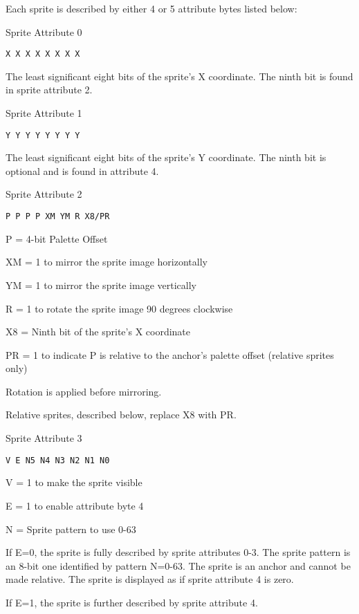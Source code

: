 Each sprite is described by either 4 or 5 attribute bytes listed
below:

Sprite Attribute 0
\begin{verbatim}
X X X X X X X X
\end{verbatim}
The least significant eight bits of the sprite’s X coordinate. The
ninth bit is found in sprite attribute 2.

Sprite Attribute 1
\begin{verbatim}
Y Y Y Y Y Y Y Y
\end{verbatim}
The least significant eight bits of the sprite’s Y coordinate. The
ninth bit is optional and is found in attribute 4.

Sprite Attribute 2
\begin{verbatim}
P P P P XM YM R X8/PR
\end{verbatim}
P = 4-bit Palette Offset

XM = 1 to mirror the sprite image horizontally

YM = 1 to mirror the sprite image vertically

R = 1 to rotate the sprite image 90 degrees clockwise

X8 = Ninth bit of the sprite’s X coordinate

PR = 1 to indicate P is relative to the anchor’s palette offset
(relative sprites only)

Rotation is applied before mirroring.

Relative sprites, described below, replace X8 with PR.


Sprite Attribute 3
\begin{verbatim}
V E N5 N4 N3 N2 N1 N0
\end{verbatim}
V = 1 to make the sprite visible

E = 1 to enable attribute byte 4

N = Sprite pattern to use 0-63

If E=0, the sprite is fully described by sprite attributes 0-3. The
sprite pattern is an 8-bit one identified by pattern N=0-63. The
sprite is an anchor and cannot be made relative. The sprite is
displayed as if sprite attribute 4 is zero.

If E=1, the sprite is further described by sprite attribute 4.

